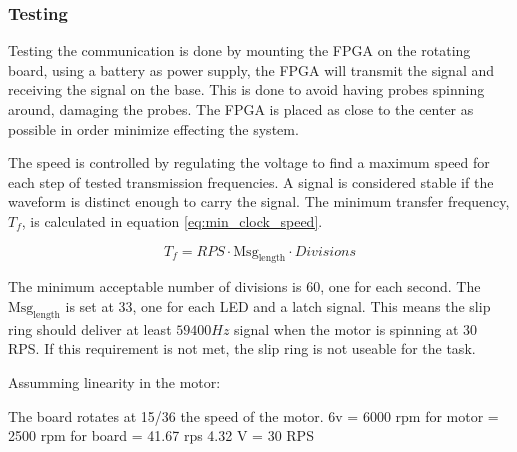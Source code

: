 %     

\subsubsection{Testing}
Testing the communication is done by mounting the FPGA on the rotating board, using a battery as power supply, the FPGA will transmit the signal and receiving the signal on the base.
This is done to avoid having probes spinning around, damaging the probes.
The FPGA is placed as close to the center as possible in order minimize effecting the system.

The speed is controlled by regulating the voltage to find a maximum speed for each step of tested transmission frequencies.
A signal is considered stable if the waveform is distinct enough to carry the signal.
The minimum transfer frequency, $T_f$, is calculated in equation \ref{eq:min_clock_speed}.

\begin{equation}
  T_f = {RPS \cdot \text{Msg}_\text{length} \cdot Divisions }
 \label{eq:min_clock_speed}
\end{equation}

The minimum acceptable number of divisions is 60, one for each second.
The $\text{Msg}_\text{length}$ is set at 33, one for each LED and a latch signal.
This means the slip ring should deliver at least $59400 Hz$ signal when the motor is spinning at 30 RPS.
If this requirement is not met, the slip ring is not useable for the task.

Assumming linearity in the motor:

The board rotates at 15/36 the speed of the motor.
6v = 6000 rpm for motor = 2500 rpm for board = 41.67 rps
4.32 V = 30 RPS


